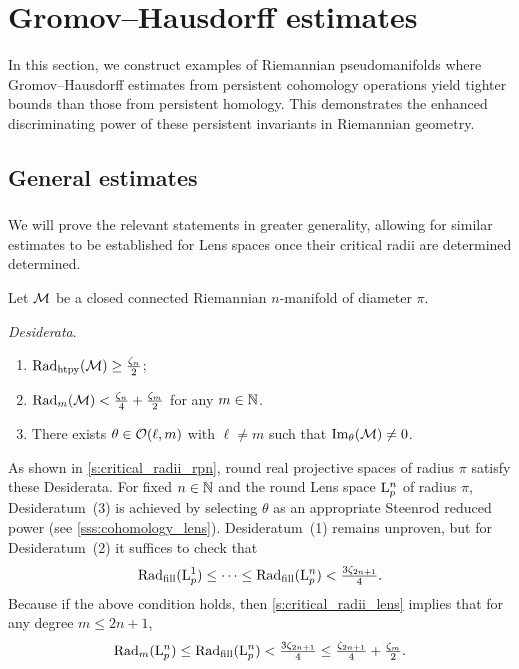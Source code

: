 
\section{Gromov--Hausdorff estimates}\label{s:gh_estimates}

In this section, we construct examples of Riemannian pseudomanifolds where Gromov--Hausdorff estimates from persistent cohomology operations yield tighter bounds than those from persistent homology.
This demonstrates the enhanced discriminating power of these persistent invariants in Riemannian geometry.

\subsection{General estimates}\label{ss:genberal_distance_comparison}

\subsubsection{}

We will prove the relevant statements in greater generality, allowing for similar estimates to be established for Lens spaces once their critical radii are determined determined.

Let $\mathcal{M}$ be a closed connected Riemannian \(n\)-manifold of diameter $\pi$.

\medskip\noindent\textit{\darkblue Desiderata}.\
\begin{enumerate}
	\item $\mathrm{Rad}_{\mathrm{htpy}}(\mathcal{M}) \geq \tfrac{\zeta_n}{2} $;
	\item $\mathrm{Rad}_{m}(\mathcal{M}) < \tfrac{\zeta_n}{4}+\tfrac{\zeta_m}{2}$ for any $m \in \mathbb{N}$.
	\item There exists $\theta \in \mathcal{O}(\ell, m)$ with \(\ell \neq m\) such that $\operatorname{Im}_\theta(\mathcal{M}) \neq 0$.
\end{enumerate}

\medskip As shown in \cref{s:critical_radii_rpn}, round real projective spaces of radius \(\pi\) satisfy these Desiderata.
For fixed $n\in \mathbb{N}$ and the round Lens space $\mathrm{L}^n_p$ of radius \(\pi\), Desideratum~(3) is achieved by selecting $\theta$ as an appropriate Steenrod reduced power (see \cref{sss:cohomology_lens}).
Desideratum~(1) remains unproven, but for Desideratum~(2) it suffices to check that
\[
\mathrm{Rad}_{\mathrm{fill}}(\mathrm{L}^1_p) \leq \dotsb \leq \mathrm{Rad}_{\mathrm{fill}}(\mathrm{L}^n_p) < \tfrac{3\zeta_{2n+1}}{4}.
\]
Because if the above condition holds, then \cref{s:critical_radii_lens} implies that for any degree $m \leq 2n+1$,
\[
\mathrm{Rad}_{m}(\mathrm{L}^n_p) \leq \mathrm{Rad}_{\mathrm{fill}}(\mathrm{L}^n_p) < \tfrac{3\zeta_{2n+1}}{4} \leq \tfrac{\zeta_{2n+1}}{4} + \tfrac{\zeta_{m}}{2}.
\]

